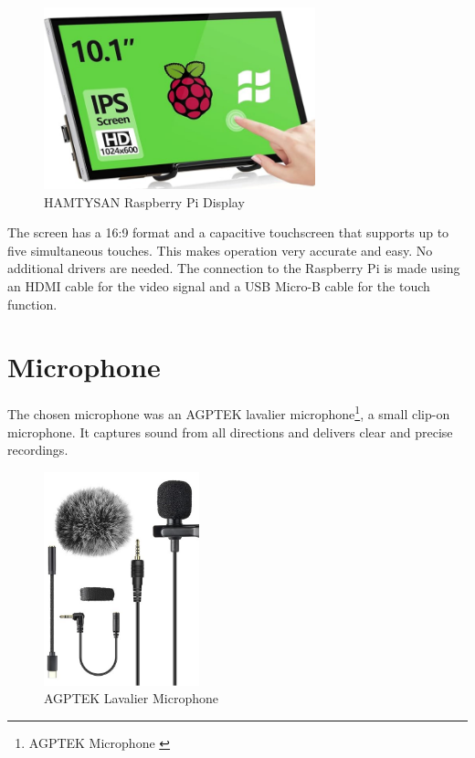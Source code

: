 \begin{figure}[H]
  \centering
  \includegraphics[width=0.7\textwidth]{assets/Bildschirm(1)}
  \caption{HAMTYSAN Raspberry Pi Display}
\end{figure}

The screen has a 16:9 format and a capacitive touchscreen that supports up to five simultaneous touches. This makes operation very accurate and easy.
No additional drivers are needed. The connection to the Raspberry Pi is made using an HDMI cable for the video signal and a USB Micro-B cable for the touch function.

\section{Microphone}
The chosen microphone was an AGPTEK lavalier microphone\footnote{AGPTEK Microphone \cite{microphone}}, a small clip-on microphone. It captures sound from all directions and delivers clear and precise recordings.

\begin{figure}[H]
  \centering
  \includegraphics[width=0.4\textwidth]{assets/Mikrofon(1)}
  \caption{AGPTEK Lavalier Microphone}
\end{figure}

